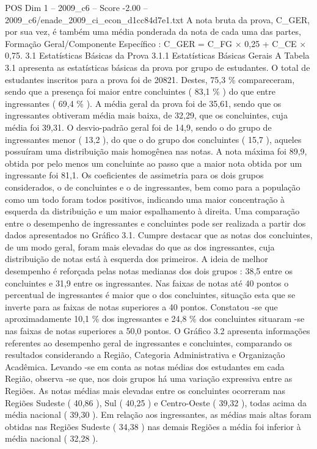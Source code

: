 \begin{textsample}{POS Dim 1 – 2009\_c6 – Score -2.00 – 2009\_c6/enade\_2009\_ci\_econ\_d1cc84d7e1.txt}
A nota bruta da prova, C\_GER, por sua vez, é também uma média ponderada da nota de cada uma das partes, Formação Geral/Componente Específico : C\_GER = C\_FG × 0,25 + C\_CE × 0,75. 3.1 Estatísticas Básicas da Prova 3.1.1 Estatísticas Básicas Gerais A Tabela 3.1 apresenta as estatísticas básicas da prova por grupo de estudantes.
O total de estudantes inscritos para a prova foi de 20821.
Destes, 75,3 \% compareceram, sendo que a presença foi maior entre concluintes ( 83,1 \% ) do que entre ingressantes ( 69,4 \% ).
A média geral da prova foi de 35,61, sendo que os ingressantes obtiveram média mais baixa, de 32,29, que os concluintes, cuja média foi 39,31.
O desvio-padrão geral foi de 14,9, sendo o do grupo de ingressantes menor ( 13,2 ), do que o do grupo dos concluintes ( 15,7 ), aqueles possuíram uma distribuição mais homogênea nas notas.
A nota máxima foi 89,9, obtida por pelo menos um concluinte ao passo que a maior nota obtida por um ingressante foi 81,1.
Os coeficientes de assimetria para os dois grupos considerados, o de concluintes e o de ingressantes, bem como para a população como um todo foram todos positivos, indicando uma maior concentração à esquerda da distribuição e um maior espalhamento à direita.
Uma comparação entre o desempenho de ingressantes e concluintes pode ser realizada a partir dos dados apresentados no Gráfico 3.1.
Cumpre destacar que as notas dos concluintes, de um modo geral, foram mais elevadas do que as dos ingressantes, cuja distribuição de notas está à esquerda dos primeiros.
A ideia de melhor desempenho é reforçada pelas notas medianas dos dois grupos : 38,5 entre os concluintes e 31,9 entre os ingressantes.
Nas faixas de notas até 40 pontos o percentual de ingressantes é maior que o dos concluintes, situação esta que se inverte para as faixas de notas superiores a 40 pontos.
Constatou -se que aproximadamente 10,1 \% dos ingressantes e 24,8 \% dos concluintes situaram -se nas faixas de notas superiores a 50,0 pontos.
O Gráfico 3.2 apresenta informações referentes ao desempenho geral de ingressantes e concluintes, comparando os resultados considerando a Região, Categoria Administrativa e Organização Acadêmica.
Levando -se em conta as notas médias dos estudantes em cada Região, observa -se que, nos dois grupos há uma variação expressiva entre as Regiões.
As notas médias mais elevadas entre os concluintes ocorreram nas Regiões Sudeste ( 40,86 ), Sul ( 40,25 ) e Centro-Oeste ( 39,32 ), todas acima da média nacional ( 39,30 ).
Em relação aos ingressantes, as médias mais altas foram obtidas nas Regiões Sudeste ( 34,38 ) nas demais Regiões a média foi inferior à média nacional ( 32,28 ).

\end{textsample}
